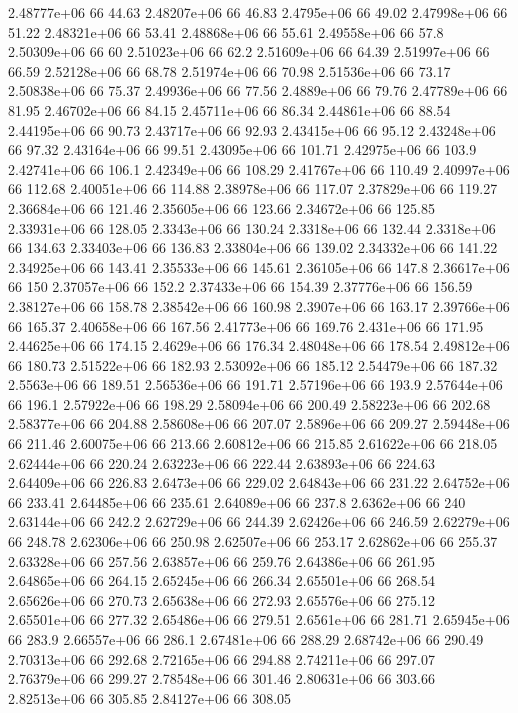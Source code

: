 2.48777e+06 66 44.63
2.48207e+06 66 46.83
2.4795e+06 66 49.02
2.47998e+06 66 51.22
2.48321e+06 66 53.41
2.48868e+06 66 55.61
2.49558e+06 66 57.8
2.50309e+06 66 60
2.51023e+06 66 62.2
2.51609e+06 66 64.39
2.51997e+06 66 66.59
2.52128e+06 66 68.78
2.51974e+06 66 70.98
2.51536e+06 66 73.17
2.50838e+06 66 75.37
2.49936e+06 66 77.56
2.4889e+06 66 79.76
2.47789e+06 66 81.95
2.46702e+06 66 84.15
2.45711e+06 66 86.34
2.44861e+06 66 88.54
2.44195e+06 66 90.73
2.43717e+06 66 92.93
2.43415e+06 66 95.12
2.43248e+06 66 97.32
2.43164e+06 66 99.51
2.43095e+06 66 101.71
2.42975e+06 66 103.9
2.42741e+06 66 106.1
2.42349e+06 66 108.29
2.41767e+06 66 110.49
2.40997e+06 66 112.68
2.40051e+06 66 114.88
2.38978e+06 66 117.07
2.37829e+06 66 119.27
2.36684e+06 66 121.46
2.35605e+06 66 123.66
2.34672e+06 66 125.85
2.33931e+06 66 128.05
2.3343e+06 66 130.24
2.3318e+06 66 132.44
2.3318e+06 66 134.63
2.33403e+06 66 136.83
2.33804e+06 66 139.02
2.34332e+06 66 141.22
2.34925e+06 66 143.41
2.35533e+06 66 145.61
2.36105e+06 66 147.8
2.36617e+06 66 150
2.37057e+06 66 152.2
2.37433e+06 66 154.39
2.37776e+06 66 156.59
2.38127e+06 66 158.78
2.38542e+06 66 160.98
2.3907e+06 66 163.17
2.39766e+06 66 165.37
2.40658e+06 66 167.56
2.41773e+06 66 169.76
2.431e+06 66 171.95
2.44625e+06 66 174.15
2.4629e+06 66 176.34
2.48048e+06 66 178.54
2.49812e+06 66 180.73
2.51522e+06 66 182.93
2.53092e+06 66 185.12
2.54479e+06 66 187.32
2.5563e+06 66 189.51
2.56536e+06 66 191.71
2.57196e+06 66 193.9
2.57644e+06 66 196.1
2.57922e+06 66 198.29
2.58094e+06 66 200.49
2.58223e+06 66 202.68
2.58377e+06 66 204.88
2.58608e+06 66 207.07
2.5896e+06 66 209.27
2.59448e+06 66 211.46
2.60075e+06 66 213.66
2.60812e+06 66 215.85
2.61622e+06 66 218.05
2.62444e+06 66 220.24
2.63223e+06 66 222.44
2.63893e+06 66 224.63
2.64409e+06 66 226.83
2.6473e+06 66 229.02
2.64843e+06 66 231.22
2.64752e+06 66 233.41
2.64485e+06 66 235.61
2.64089e+06 66 237.8
2.6362e+06 66 240
2.63144e+06 66 242.2
2.62729e+06 66 244.39
2.62426e+06 66 246.59
2.62279e+06 66 248.78
2.62306e+06 66 250.98
2.62507e+06 66 253.17
2.62862e+06 66 255.37
2.63328e+06 66 257.56
2.63857e+06 66 259.76
2.64386e+06 66 261.95
2.64865e+06 66 264.15
2.65245e+06 66 266.34
2.65501e+06 66 268.54
2.65626e+06 66 270.73
2.65638e+06 66 272.93
2.65576e+06 66 275.12
2.65501e+06 66 277.32
2.65486e+06 66 279.51
2.6561e+06 66 281.71
2.65945e+06 66 283.9
2.66557e+06 66 286.1
2.67481e+06 66 288.29
2.68742e+06 66 290.49
2.70313e+06 66 292.68
2.72165e+06 66 294.88
2.74211e+06 66 297.07
2.76379e+06 66 299.27
2.78548e+06 66 301.46
2.80631e+06 66 303.66
2.82513e+06 66 305.85
2.84127e+06 66 308.05
